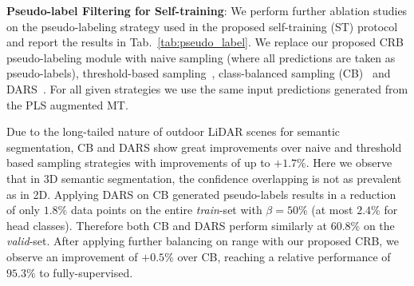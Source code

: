 \documentclass[10pt,twocolumn,letterpaper]{article}
\begin{document}
\noindent \textbf{Pseudo-label Filtering for Self-training}: We perform further ablation studies on the pseudo-labeling strategy used in the proposed self-training (ST) protocol and report the results in Tab.~\ref{tab:pseudo_label}. We replace our proposed CRB pseudo-labeling module with naive sampling (where all predictions are taken as pseudo-labels), threshold-based sampling~\cite{aaai2020curriculum,cvpr2020selftraining, arxiv2020rethinking}, class-balanced sampling (CB)~\cite{eccv2018classbalanced} and DARS~\cite{iccv2021dars}. For all given strategies we use the same input predictions generated from the PLS augmented MT.

Due to the long-tailed nature of outdoor LiDAR scenes for semantic segmentation, CB and DARS show great improvements over naive and threshold based sampling strategies with improvements of up to $+1.7\%$. Here we observe that in 3D semantic segmentation, the confidence overlapping is not as prevalent as in 2D. Applying DARS on CB generated pseudo-labels results in a reduction of only $1.8\%$ data points on the entire \textit{train}-set with $\beta=50\%$ (at most $2.4\%$ for head classes). Therefore both CB and DARS perform similarly at $60.8\%$ on the \textit{valid}-set.
After applying further balancing on range with our proposed CRB, we observe an improvement of $+0.5\%$ over CB, reaching a relative performance of $95.3\%$ to fully-supervised.

\begin{table}[t]
    \centering
    \tabcolsep=0.11cm
    \caption{Ablation study on the pseudo-labeling strategies comparing naive (all predictions), threshold-based, class-balanced labeling and DARS with our proposed CRB. $\beta$ determines the percentage of labeled points. Performances are reported on the SemanticKITTI \textit{valid}-set. All methods use the same initial labels.
    \label{tab:pseudo_label}}
\end{table}
\end{document}
